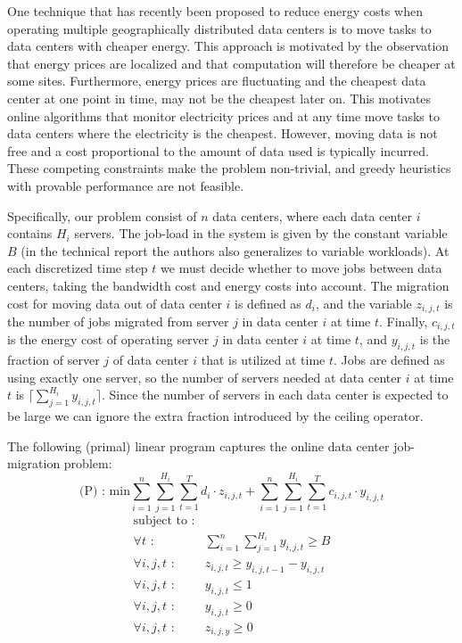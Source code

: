 One technique that has recently been proposed to reduce energy costs when operating multiple geographically distributed data centers is to move tasks to data centers with cheaper energy.
This approach is motivated by the observation that energy prices are localized and that computation will therefore be cheaper at some sites.
Furthermore, energy prices are fluctuating and the cheapest data center at one point in time, may not be the cheapest later on.
This motivates online algorithms that monitor electricity prices and at any time move tasks to data centers where the electricity is the cheapest.
However, moving data is not free and a cost proportional to the amount of data used is typically incurred.
These competing constraints make the problem non-trivial, and greedy heuristics with provable performance are not feasible.

Specifically, our problem consist of $n$ data centers, where each data center $i$ contains $H_i$ servers.
The job-load in the system is given by the constant variable $B$ (in the technical report the authors also generalizes to variable workloads).
At each discretized time step $t$ we must decide whether to move jobs between data centers, taking the bandwidth cost and energy costs into account.
The migration cost for moving data out of data center $i$ is defined as $d_i$, and the variable $z_{i,j,t}$ is the number of jobs migrated from server $j$ in data center $i$ at time $t$.
Finally, $c_{i,j,t}$ is the energy cost of operating server $j$ in data center $i$ at time $t$, and $y_{i,j,t}$ is the fraction of server $j$ of data center $i$ that is utilized at time $t$.
Jobs are defined as using exactly one server, so the number of servers needed at data center $i$ at time $t$ is $\lceil \sum^{H_i}_{j=1}y_{i,j,t} \rceil$.
Since the number of servers in each data center is expected to be large we can ignore the extra fraction introduced by the ceiling operator.

The following (primal) linear program captures the online data center job-migration problem:
\[
\textrm{(P) : min}  \sum^n_{i=1}\sum^{H_i}_{j=1}\sum^{T}_{t=1}d_{i} \cdot z_{i,j,t} + \sum^{n}_{i=1}\sum^{H_{i}}_{j=1}\sum^{T}_{t=1} c_{i,j,t} \cdot y_{i,j,t}
\]
\[
	\begin{array}{rc}
	\textrm{subject to :} & \\
		\forall t \textrm{ :} & \sum^n_{i=1}\sum^{H_i}_{j=1}y_{i,j,t} \geq B \\
		\forall i,j,t \textrm{ :}	    & z_{i,j,t} \geq y_{i,j,t-1} - y_{i,j,t} \\
		\forall i,j,t \textrm{ :}	    & y_{i,j,t} \leq 1 \\
		\forall i,j,t \textrm{ :}	    & y_{i,j,t} \geq 0 \\
		\forall i,j,t \textrm{ :}	    & z_{i,j,y} \geq 0
	\end{array}
\]

